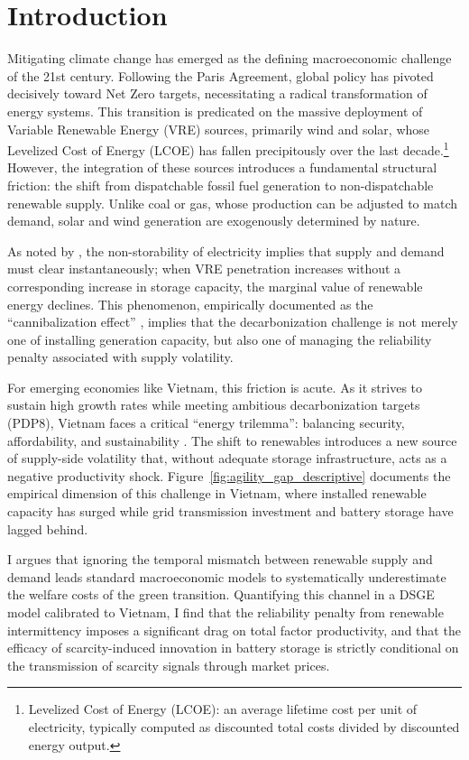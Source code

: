 	\section{Introduction}
	
	Mitigating climate change has emerged as the defining macroeconomic challenge of the 21st century. Following the Paris Agreement, global policy has pivoted decisively toward Net Zero targets, necessitating a radical transformation of energy systems. This transition is predicated on the massive deployment of Variable Renewable Energy (VRE) sources, primarily wind and solar, whose Levelized Cost of Energy (LCOE) has fallen precipitously over the last decade.\footnote{Levelized Cost of Energy (LCOE): an average lifetime cost per unit of electricity, typically computed as discounted total costs divided by discounted energy output.} However, the integration of these sources introduces a fundamental structural friction: the shift from dispatchable fossil fuel generation to non-dispatchable renewable supply. Unlike coal or gas, whose production can be adjusted to match demand, solar and wind generation are exogenously determined by nature.
	
	As noted by \citet{ambec2012}, the non-storability of electricity implies that supply and demand must clear instantaneously; when VRE penetration increases without a corresponding increase in storage capacity, the marginal value of renewable energy declines. This phenomenon, empirically documented as the ``cannibalization effect'' \citep{hirth2013}, implies that the decarbonization challenge is not merely one of installing generation capacity, but also one of managing the reliability penalty associated with supply volatility.
	
	For emerging economies like Vietnam, this friction is acute. As it strives to sustain high growth rates while meeting ambitious decarbonization targets (PDP8), Vietnam faces a critical ``energy trilemma'': balancing security, affordability, and sustainability \citep{liu2022Roles}. 	The shift to renewables introduces a new source of supply-side volatility that, without adequate storage infrastructure, acts as a negative productivity shock. Figure~\ref{fig:agility_gap_descriptive} documents the empirical dimension of this challenge in Vietnam, where installed renewable capacity has surged while grid transmission investment and battery storage have lagged behind.  
	
	I argues that ignoring the temporal mismatch between renewable supply and
	demand leads standard macroeconomic models to systematically underestimate the welfare costs
	of the green transition. Quantifying this channel in a DSGE model calibrated to Vietnam, I find
	that the reliability penalty from renewable intermittency imposes a significant drag on total factor productivity, and that the efficacy of scarcity-induced innovation in battery storage is strictly
	conditional on the transmission of scarcity signals through market prices.
	
